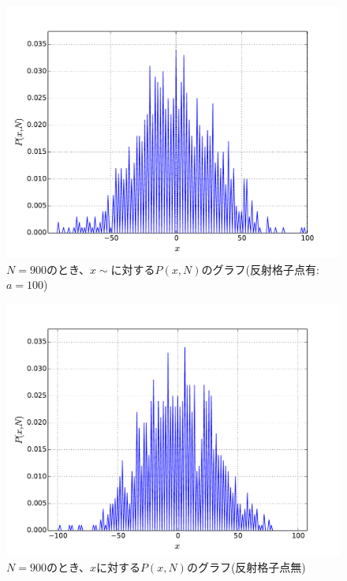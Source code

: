 \documentclass{jsarticle}
\begin{document}
\begin{enumerate}
\begin{enumerate}
                    \begin{figure}[H]
                        \begin{center}
                        \includegraphics[width=12.5cm]{figure_1.pdf}
                        \caption{$N=900$のとき、$x\sim$に対する$P(x,N)$のグラフ(反射格子点有:$a=100$)}
                        \label{fig:3}
                    \end{center}
                    \end{figure}
                    
                    
                    \begin{figure}[H]
                        \begin{center}
                        \includegraphics[width=12.5cm]{figure_4.pdf}
                        \caption{$N=900$のとき、$x$に対する$P(x,N)$のグラフ(反射格子点無)}
                        \label{fig:4}
                    \end{center}
                    \end{figure}
                    

\end{enumerate}
\end{enumerate}
\end{document}
